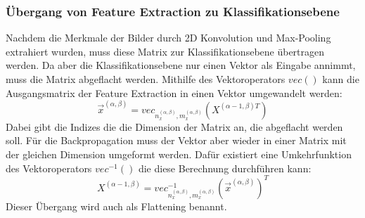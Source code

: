 \documentclass[11pt]{article}
\begin{document}
\subsubsection{Übergang von Feature Extraction zu Klassifikationsebene}
Nachdem die Merkmale der Bilder durch 2D Konvolution und Max-Pooling extrahiert wurden, muss diese Matrix zur Klassifikationsebene übertragen werden.
Da aber die Klassifikationsebene nur einen Vektor als Eingabe annimmt, muss die Matrix abgeflacht werden. Mithilfe des Vektoroperators $vec()$ kann die
Ausgangsmatrix der Feature Extraction in einen Vektor umgewandelt werden:
\begin{equation}
    \vec{x}^{(\alpha,\beta)} = vec_{n_{x}^{(\alpha,\beta)}, m_{x}^{(\alpha,\beta)}}(X^{(\alpha-1,\beta)T})
\end{equation}
Dabei gibt die Indizes die die Dimension der Matrix an, die abgeflacht werden soll. Für die Backpropagation muss der Vektor aber wieder in einer Matrix mit
der gleichen Dimension umgeformt werden. Dafür existiert eine Umkehrfunktion des Vektoroperators $vec^{-1}()$ die diese Berechnung durchführen kann:
\begin{equation}
    X^{(\alpha-1,\beta)} = vec^{-1}_{n_{x}^{(\alpha,\beta)}, m_{x}^{(\alpha,\beta)}}{(\vec{x}^{(\alpha,\beta)})}^{T}
\end{equation}
Dieser Übergang wird auch als Flattening benannt.
\end{document}

